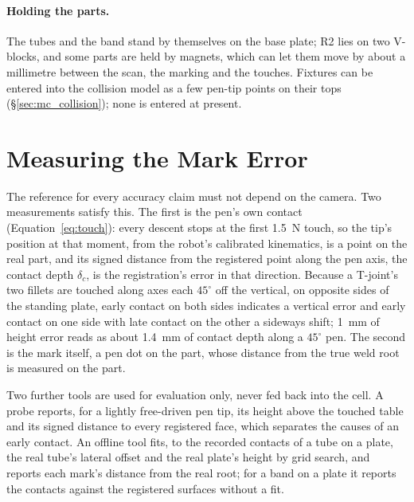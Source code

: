 \paragraph{Holding the parts.} The tubes and the band stand by themselves on the base plate; R2 lies
on two V-blocks, and some parts are held by magnets, which can let them move by about a millimetre
between the scan, the marking and the touches. Fixtures can be entered into the collision model as a
few pen-tip points on their tops (\S\ref{sec:mc_collision}); none is entered at present.

\section{Measuring the Mark Error}
\label{sec:setup_measure}
The reference for every accuracy claim must not depend on the camera. Two measurements satisfy
this. The first is the pen's own contact (Equation~\ref{eq:touch}): every descent stops at the first
1.5~N touch, so the tip's position at that moment, from the robot's calibrated kinematics, is a point
on the real part, and its signed distance from the registered point along the pen axis, the contact
depth $\delta_c$, is the registration's error in that direction. Because a T-joint's two fillets are
touched along axes each $45^\circ$ off the vertical, on opposite sides of the standing plate, early contact on both sides indicates a vertical error and early
contact on one side with late contact on the other a sideways shift; 1~mm of height error reads as
about 1.4~mm of contact depth along a $45^\circ$ pen. The second is the mark itself, a pen dot on the
part, whose distance from the true weld root is measured on the part.

Two further tools are used for evaluation only, never fed back into the cell. A probe reports, for a
lightly free-driven pen tip, its height above the touched table and its signed distance to every
registered face, which separates the causes of an early contact. An offline tool fits, to the
recorded contacts of a tube on a plate, the real tube's lateral offset and the real plate's height by
grid search, and reports each mark's distance from the real root; for a band on a plate it reports the
contacts against the registered surfaces without a fit.

